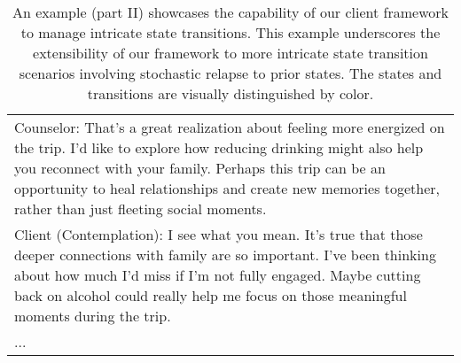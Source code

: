 \begin{table*}[htbp]
\begin{tabularx}{\textwidth}{X}
Counselor: That's a great realization about feeling more energized on the trip. I'd like to explore how reducing drinking might also help you reconnect with your family. Perhaps this trip can be an opportunity to heal relationships and create new memories together, rather than just fleeting social moments. \\
Client {\color{red} (Contemplation)}: I see what you mean. It's true that those deeper connections with family are so important. I’ve been thinking about how much I’d miss if I’m not fully engaged. Maybe cutting back on alcohol could really help me focus on those meaningful moments during the trip. \\
...                                                                                                               \\ \bottomrule    
\end{tabularx}
\caption{An example (part II) showcases the capability of our client framework to manage intricate state transitions. This example underscores the extensibility of our framework to more intricate state transition scenarios involving stochastic relapse to prior states. The states and transitions are visually distinguished by color.}
\label{tab:complex transition2}
\end{table*}

